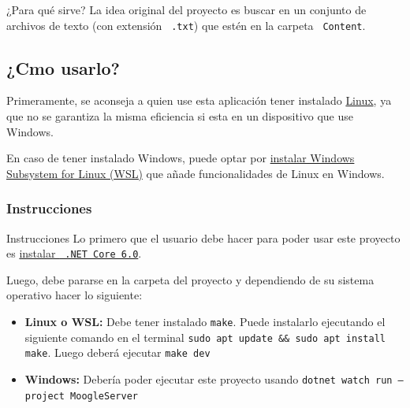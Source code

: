 \documentclass{beamer}
\begin{document}
\begin{frame}{¿Para qué sirve?}
  La idea original del proyecto es buscar en un conjunto de archivos de texto
  (con extensión {\tt \color{gray45} .txt}) que estén en la carpeta {\tt
      \color{gray45}Content}.
\end{frame}

\subsection*{¿Cmo usarlo?}

\begin{frame}
  Primeramente, se aconseja a quien use esta aplicación tener instalado
  \href{https://es.wikipedia.org/wiki/Linux}{Linux}, ya que no se garantiza la
  misma eficiencia si esta en un dispositivo que use Windows.
\end{frame}

\begin{frame}
  En caso de tener instalado Windows, puede optar por
  \href{https://learn.microsoft.com/es-es/windows/wsl/install}{instalar Windows
    Subsystem for Linux (WSL)} que a\~nade funcionalidades de Linux en Windows.
\end{frame}

\subsubsection*{Instrucciones}

\begin{frame}{Instrucciones}
  Lo primero que el usuario debe hacer para poder usar este proyecto es
  \href{https://learn.microsoft.com/es-es/dotnet/core/install/}{instalar {\tt
        .NET Core 6.0}}.

  \pause

  Luego, debe pararse en la carpeta del proyecto y dependiendo de su sistema
  operativo hacer lo siguiente:

  \begin{itemize}[<+->]
    \item {\bf Linux o WSL:} Debe tener instalado {\tt make}. Puede instalarlo ejecutando el siguiente comando en el terminal {\tt sudo apt update \&\& sudo apt install make}. Luego deber\'a ejecutar {\tt make dev}
    \item {\bf Windows:}  Debería poder ejecutar este proyecto usando {\tt dotnet watch run --project MoogleServer}
  \end{itemize}
\end{frame}
\end{document}
